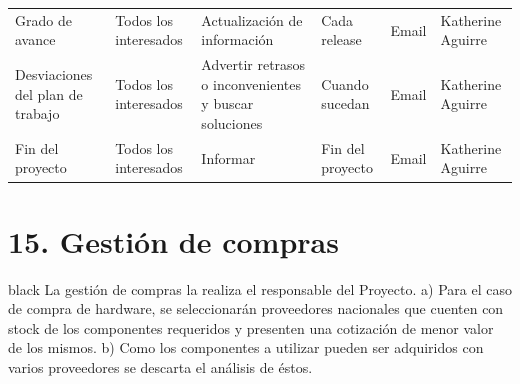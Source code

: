 \documentclass[11pt]{charter}
\begin{document}
\begin{landscape}
\begin{tabularx}{\linewidth}{@{}|p{6.8cm}|p{4cm}|p{4cm}|p{4cm}|p{2cm}|p{2cm}|@{}}
Grado de   avance                                                 & Todos los interesados & Actualización de información                             & Cada release                   & Email                & Katherine Aguirre \\
Desviaciones   del plan de trabajo                                & Todos los interesados & Advertir retrasos o   inconvenientes y buscar soluciones & Cuando sucedan                 & Email                & Katherine Aguirre \\
Fin del   proyecto                                                & Todos los interesados & Informar                                                 & Fin del proyecto               & Email                & Katherine Aguirre
\\ \hline
\end{tabularx}


\section{15. Gestión de compras}
\label{sec:compras}

\begin{consigna}{black}
La gestión de compras la realiza el responsable del Proyecto.
a) Para el caso de compra de hardware, se seleccionarán proveedores nacionales que cuenten con stock de los componentes requeridos y presenten una cotización de menor valor de los mismos. 
b) Como los componentes a utilizar pueden ser adquiridos con varios proveedores se descarta el análisis de éstos.
\end{consigna}
\end{landscape}
\end{document}
